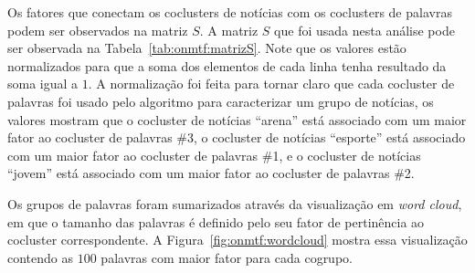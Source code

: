 \documentclass[
    12pt,                %
    oneside,            %
    a4paper,            %
    english,            %
    brazil                %
    ]{abntex2ppgsi}
\begin{document}
Os fatores que conectam os coclusters de notícias com os coclusters de palavras podem ser observados na matriz $S$.
A matriz $S$ que foi usada nesta análise pode ser observada na Tabela~\ref{tab:onmtf:matrizS}.
Note que os valores estão normalizados para que a soma dos elementos de cada linha tenha resultado da soma igual a $1$.
A normalização foi feita para tornar claro que cada cocluster de palavras foi usado pelo algoritmo para caracterizar um grupo de notícias, os valores mostram que o cocluster de notícias ``arena'' está associado com um maior fator ao cocluster de palavras \#3, o cocluster de notícias ``esporte'' está associado com um maior fator ao cocluster de palavras \#1, e o cocluster de notícias ``jovem'' está associado com um maior fator ao cocluster de palavras \#2.

\begin{table}[H]
\label{tab:onmtf:matrizS}
\centering
    \caption{Matriz $S$ para \textit{ONMTF} com $k = l = 3$.}
\end{table}

Os grupos de palavras foram sumarizados através da visualização em \textit{word cloud}, em que o tamanho das palavras é definido pelo seu fator de pertinência ao cocluster correspondente.
A Figura~\ref{fig:onmtf:wordcloud} mostra essa visualização contendo as $100$ palavras com maior fator para cada cogrupo.
\end{document}
